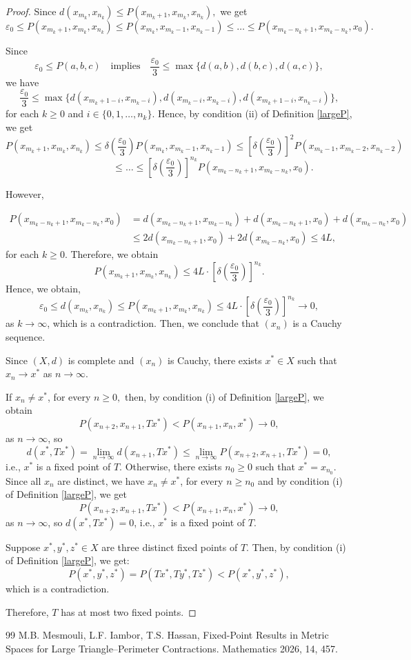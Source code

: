 \documentclass[10pt,a4paper]{amsart}
\begin{document}
\begin{proof}
		Since \(d(x_{m_k}, x_{n_k}) \leq P(x_{m_k+1}, x_{m_k}, x_{n_k}),\) we get
		\[\varepsilon_0 \leq P(x_{m_k+1}, x_{m_k}, x_{n_k}) \leq P(x_{m_k}, x_{m_k-1}, x_{n_k-1}) \leq \dots \leq P(x_{m_k-n_k+1}, x_{m_k-n_k}, x_{0}).\]
		
		Since 
		\[\varepsilon_0 \leq P(a,b,c) \quad \text{implies} \quad \dfrac{\varepsilon_0}{3}\leq \max \{d(a,b), d(b,c), d(a,c)\}, \]
		we have \[ \dfrac{\varepsilon_0}{3}\leq \max \{d(x_{m_k+1-i},x_{m_k-i}), d(x_{m_k-i},x_{n_k-i}), d(x_{m_k+1-i},x_{n_k-i})\}, \]
		for each \(k \geq 0\) and \(i \in \{0,1,\dots, n_k\}\). Hence, by condition (ii) of Definition \ref{largeP}, we get
		\[ P(x_{m_k+1}, x_{m_k}, x_{n_k}) \leq \delta\left(\dfrac{\varepsilon_0}{3}\right) P(x_{m_k}, x_{m_k-1}, x_{n_k-1}) \leq \left[\delta\left(\dfrac{\varepsilon_0}{3}\right)\right]^2 P(x_{m_k-1}, x_{m_k-2}, x_{n_k-2})  \]
		\[\quad \qquad \qquad \qquad \leq \dots \leq \left[\delta\left(\dfrac{\varepsilon_0}{3}\right)\right]^{n_k}  P(x_{m_k-n_k+1}, x_{m_k-n_k}, x_{0}).\]
		
		However,
		
		\begin{align*} P(x_{m_k-n_k+1}, x_{m_k-n_k}, x_{0}) &= d(x_{m_k-n_k+1},x_{m_k-n_k})+ d(x_{m_k-n_k+1},x_0)+d(x_{m_k-n_k},x_0)\\ &\leq 2 d(x_{m_k-n_k+1},x_0) + 2 d(x_{m_k-n_k},x_0)\leq 4L, \end{align*}
		for each $k \geq 0$. Therefore, we obtain
		\[P(x_{m_k+1}, x_{m_k}, x_{n_k}) \leq 4L \cdot \left[\delta\left(\dfrac{\varepsilon_0}{3}\right)\right]^{n_k}.  \]
		Hence, we obtain,
		\[\varepsilon_0 \leq d(x_{m_k}, x_{n_k}) \leq P(x_{m_k+1}, x_{m_k}, x_{n_k}) \leq 4L \cdot \left[\delta\left(\dfrac{\varepsilon_0}{3}\right)\right]^{n_k} \to 0, \]
		as $k \to \infty$, which is a contradiction. Then, we conclude that \((x_n)\) is a Cauchy sequence.
		
		Since $(X,d)$ is complete and \((x_n)\) is Cauchy, there exists \(x^*\in X\) such that \(x_n\to x^*\) as \(n \to \infty\).
		
		If \(x_n \neq x^*\), for every \(n \geq 0,\) then, by condition (i) of Definition \ref{largeP}, we obtain 
		\[ P(x_{n+2}, x_{n+1}, Tx^*) < P(x_{n+1}, x_{n}, x^*) \to 0,\]
		as \(n \to \infty\), so \[d(x^*, Tx^*) = \lim\limits_{n\to \infty} d(x_{n+1}, Tx^*) \leq \lim\limits_{n\to \infty} P(x_{n+2}, x_{n+1}, Tx^*) = 0,\] i.e., \(x^*\) is a fixed point of \(T\). Otherwise, there exists \(n_0 \geq 0\) such that \(x^*=x_{n_0}\). Since all \(x_n\) are distinct, we have \(x_n \neq x^*\), for every \(n \geq n_0\) and by condition (i) of Definition \ref{largeP}, we get
		\[ P(x_{n+2}, x_{n+1}, Tx^*) < P(x_{n+1}, x_{n}, x^*) \to 0,\]
		as \(n \to \infty\), so \(d(x^*, Tx^*) = 0\), i.e., \(x^*\) is a fixed point of \(T\).
		
		Suppose \(x^*, y^*, z^* \in X\) are three distinct fixed points of \(T\). Then, by condition (i) of Definition \ref{largeP}, we get:
		\[P(x^*, y^*, z^*) = P(Tx^*, Ty^*, Tz^*) < P(x^*, y^*, z^*),\]
		which is a contradiction.
		
		Therefore, \(T\) has at most two fixed points.
	\end{proof}

\begin{thebibliography}{99}
 M.B. Mesmouli, L.F. Iambor, T.S. Hassan, Fixed-Point Results in Metric Spaces for Large Triangle–Perimeter Contractions. Mathematics 2026, 14, 457.
\end{thebibliography}
\end{document}
